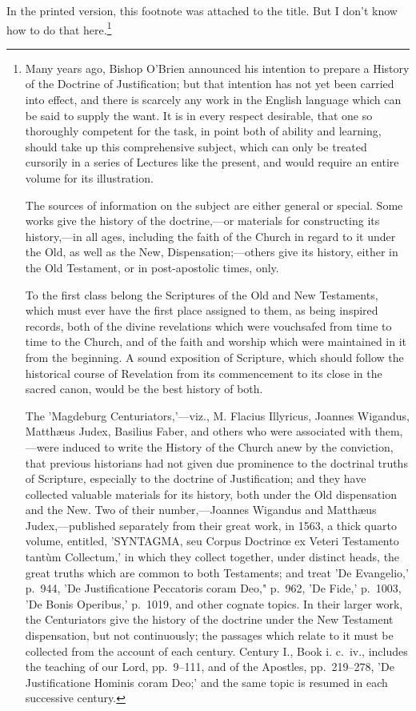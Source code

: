 \documentclass[
]{book}
\begin{document}
In the printed version, this footnote was attached to the title. But I don't know how to do that here.\footnote{Many years ago, Bishop O'Brien announced his intention to prepare a History of the Doctrine of Justification; but that intention has not yet been carried into effect, and there is scarcely any work in the English language which can be said to supply the want. It is in every respect desirable, that one so thoroughly competent for the task, in point both of ability and learning, should take up this comprehensive subject, which can only be treated cursorily in a series of Lectures like the present, and would require an entire volume for its illustration.

  The sources of information on the subject are either general or special. Some works give the history of the doctrine,---or materials for constructing its history,---in all ages, including the faith of the Church in regard to it under the Old, as well as the New, Dispensation;---others give its history, either in the Old Testament, or in post-apostolic times, only.

  To the first class belong the Scriptures of the Old and New Testaments, which must ever have the first place assigned to them, as being inspired records, both of the divine revelations which were vouchsafed from time to time to the Church, and of the faith and worship which were maintained in it from the beginning. A sound exposition of Scripture, which should follow the historical course of Revelation from its commencement to its close in the sacred canon, would be the best history of both.

  The 'Magdeburg Centuriators,'---viz., M. Flacius Illyricus, Joannes Wigandus, Matthæus Judex, Basilius Faber, and others who were associated with them,---were induced to write the History of the Church anew by the conviction, that previous historians had not given due prominence to the doctrinal truths of Scripture, especially to the doctrine of Justification; and they have collected valuable materials for its history, both under the Old dispensation and the New. Two of their number,---Joannes Wigandus and Matthæus Judex,---published separately from their great work, in 1563, a thick quarto volume, entitled, 'SYNTAGMA, seu Corpus Doctrinœ ex Veteri Testamento tantùm Collectum,' in which they collect together, under distinct heads, the great truths which are common to both Testaments; and treat 'De Evangelio,' p.~944, 'De Justificatione Peccatoris coram Deo," p.~962, 'De Fide,' p.~1003, 'De Bonis Operibus,' p.~1019, and other cognate topics. In their larger work, the Centuriators give the history of the doctrine under the New Testament dispensation, but not continuously; the passages which relate to it must be collected from the account of each century. Century I., Book i. c.~iv., includes the teaching of our Lord, pp.~9--111, and of the Apostles, pp.~219--278, 'De Justificatione Hominis coram Deo;' and the same topic is resumed in each successive century.

}
\end{document}
